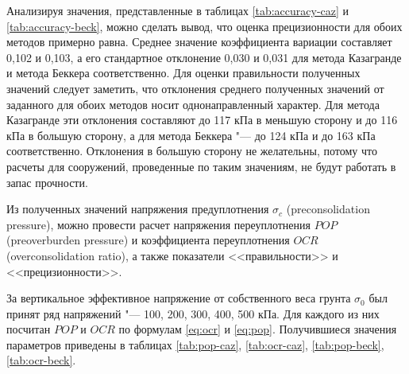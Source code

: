 Анализируя значения, представленные в таблицах \ref{tab:accuracy-caz} и \ref{tab:accuracy-beck}, можно сделать вывод, что оценка прецизионности для обоих методов примерно равна. Среднее значение коэффициента вариации составляет 0,102 и 0,103, а его стандартное отклонение 0,030 и 0,031 для метода Казагранде и метода Беккера соответственно. Для оценки правильности полученных значений следует заметить, что отклонения среднего полученных значений от заданного для обоих методов носит однонаправленный характер. Для метода Казагранде эти отклонения составляют до 117 кПа в меньшую сторону и до 116 кПа в большую сторону, а для метода Беккера "--- до 124 кПа и до 163 кПа соответственно. Отклонения в большую сторону не желательны, потому что расчеты для сооружений, проведенные по таким значениям, не будут работать в запас прочности.



Из полученных значений напряжения предуплотнения $\sigma_c$ (preconsolidation pressure), можно провести расчет напряжения переуплотнения $POP$ (preoverburden pressure) и коэффициента переуплотнения $OCR$ (overconsolidation ratio), а также показатели <<правильности>> и <<прецизионности>>.


За вертикальное эффективное напряжение от собственного веса грунта $\sigma_0$ был принят ряд напряжений "--- 100, 200, 300, 400, 500 кПа.
Для каждого из них посчитан $POP$ и $OCR$ по формулам \ref{eq:ocr} и \ref{eq:pop}.
Получившиеся значения параметров приведены в таблицах \ref{tab:pop-caz}, \ref{tab:ocr-caz}, \ref{tab:pop-beck}, \ref{tab:ocr-beck}.



